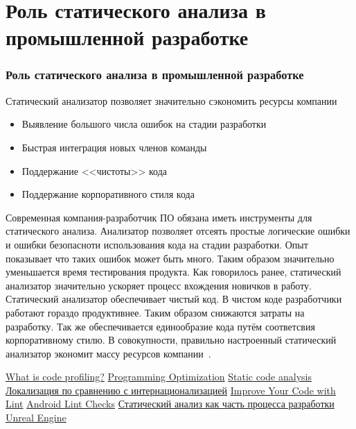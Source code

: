 \documentclass{../industrial-development}
\begin{document}
\section{Роль статического анализа в промышленной разработке}
\begin{frame} \frametitle{Роль статического анализа в промышленной разработке}
	\begin{block}{}
		Статический анализатор позволяет значительно сэкономить ресурсы компании
	\end{block}
	\begin{itemize}
		\item Выявление большого числа ошибок на стадии разработки
		\item Быстрая интеграция новых членов команды
		\item Поддержание <<чистоты>> кода
		\item Поддержание корпоративного стиля кода
	\end{itemize}
\end{frame}
\lecturenotes
Современная компания-разработчик ПО обязана иметь инструменты для статического анализа. Анализатор позволяет отсеять простые логические ошибки и ошибки безопасноти использования кода на стадии разработки. Опыт показывает что таких ошибок может быть много. Таким образом значительно уменьшается время тестирования продукта.
Как говорилось ранее, статический анализатор значительно ускоряет процесс вхождения новичков в работу.
Статический анализатор обеспечивает чистый код. В чистом коде разработчики работают гораздо продуктивнее. Таким образом снижаются затраты на разработку. Так же обеспечивается единообразие кода путём соответсвия корпоративному стилю.
В совокупности, правильно настроенный статический анализатор экономит массу ресурсов компании~\cite{StaticAnalisys}.

\begin{thebibliography}{99}
	 \href{https://stackify.com/what-is-code-profiling/}{What is code profiling?}
	 \href{http://www.azillionmonkeys.com/qed/optimize.html}{Programming Optimization}
	 \href{https://www.viva64.com/en/t/0046/}{Static code analysis}
	 \href{https://www.w3.org/International/questions/qa-i18n.ru}{Локализация по сравнению с интернационализацией}
	 \href{https://developer.android.com/studio/write/lint.html}{Improve Your Code with Lint}
	 \href{http://tools.android.com/tips/lint-checks}{Android Lint Checks}
	 \href{https://habrahabr.ru/company/pvs-studio/blog/331724/}{Статический анализ как часть процесса разработки Unreal Engine}
\end{thebibliography}
\end{document}

